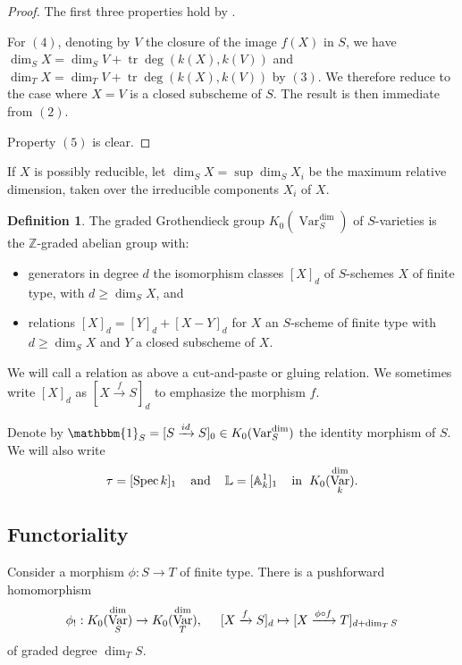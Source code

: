 \documentclass{amsart}
\theoremstyle{definition}
\newtheorem{defn}[thm]{Definition}
\DeclareMathOperator{\Var}{Var}
\DeclareMathOperator{\tr}{tr}
\newcommand{\Kdim}{K_0(\Var_k^{\dim})}
\newcommand{\KdimS}{K_0(\Var_S^{\dim})}
\numberwithin{equation}{section}
\begin{document}
\begin{proof}
The first three properties hold by \cite[Lemma $20.1$]{fulton2013intersection}.

For $(4)$, denoting by $V$ the closure of the image $f(X)$ in $S$, we have $\dim_S X = \dim_S V + \tr \deg(k(X), k(V))$ and $\dim_T X = \dim_T V + \tr \deg(k(X), k(V))$ by $(3)$. We therefore reduce to the case where $X = V$ is a closed subscheme of $S$. The result is then immediate from $(2)$. 

Property $(5)$ is clear.
\end{proof}

If $X$ is possibly reducible, let $\dim_S X = \sup \dim_S X_i$ be the maximum relative dimension, taken over the irreducible components $X_i$ of $X$.

\begin{defn}\label{graded K0S}
The graded Grothendieck group $\KdimS$ of $S$-varieties is the $\mathbb{Z}$-graded abelian group with:

\begin{itemize}
    \item generators in degree $d$ the isomorphism classes $[X]_d$ of $S$-schemes $X$ of finite type, with $d \geq \dim_S X$, and
    \item relations $[X]_d = [Y]_d + [X-Y]_d$ for $X$ an $S$-scheme of finite type with $d \geq \dim_S X$ and $Y$ a closed subscheme of $X$.
\end{itemize} 
\end{defn}

We will call a relation as above a cut-and-paste or gluing relation. We sometimes write $[X]_d$ as $[X \xrightarrow[]{f} S]_d$ to emphasize the morphism $f$. 

Denote by $\mathbbm{1}_S =  [S \xrightarrow[]{id} S]_0 \in \KdimS$ the identity morphism of $S$. We will also write
\begin{align*}
    \tau = [\mathop{\mathrm{Spec}}k]_1 \hspace{.4cm} \mathrm{and} \hspace{.4cm} \mathbb{L} = [\mathbb{A}_k^1]_1 \hspace{.4cm} \mathrm{in} \hspace{.2cm} \Kdim.
\end{align*}


\subsection{Functoriality}
Consider a morphism $\phi: S \rightarrow T$ of finite type. There is a pushforward homomorphism
\begin{align*}
    \phi_!: \KdimS \rightarrow K_0(\Var_T^{\dim}), \hspace{.5cm} [X \xrightarrow[]{f} S]_d \mapsto [X \xrightarrow[]{\phi \circ f}T]_{d+ \dim_T S}
\end{align*}
of graded degree $\dim_T S$.
\end{document}
